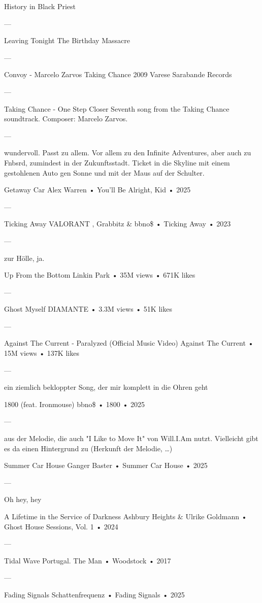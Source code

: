 History in Black
Priest

—

Leaving Tonight
The Birthday Massacre

—

Convoy - Marcelo Zarvos
Taking Chance
2009 Varese Sarabande Records

—

Taking Chance - One Step Closer
Seventh song from the Taking Chance soundtrack. Composer: Marcelo Zarvos.

—

wundervoll. Passt zu allem.
Vor allem zu den Infinite Adventures, aber auch zu Fnbsrd, zumindest in der Zukunftsstadt.
Ticket in die Skyline mit einem gestohlenen Auto gen Sonne und mit der Maus auf der Schulter.

Getaway Car
Alex Warren
 •
You'll Be Alright, Kid
 •
2025

—

Ticking Away
VALORANT
,
Grabbitz
 &
bbno\$
 •
Ticking Away
 •
2023

—

zur Hölle, ja.

Up From the Bottom
Linkin Park
 •
35M views
 •
671K likes


—

Ghost Myself
DIAMANTE
 •
3.3M views
 •
51K likes

—

Against The Current - Paralyzed (Official Music Video)
Against The Current
 •
15M views
 •
137K likes

—

ein ziemlich bekloppter Song, der mir komplett in die Ohren geht

1800 (feat. Ironmouse)
bbno\$
 •
1800
 •
2025

—

aus der Melodie, die auch "I Like to Move It" von Will.I.Am nutzt. Vielleicht gibt es da einen Hintergrund zu (Herkunft der Melodie, …)

Summer Car House
Ganger Baster
 •
Summer Car House
 •
2025

—

Oh hey,
hey

A Lifetime in the Service of Darkness
Ashbury Heights & Ulrike Goldmann
 •
Ghost House Sessions, Vol. 1
 •
2024

—

Tidal Wave
Portugal. The Man
 •
Woodstock
 • 2017

—

Fading Signals
Schattenfrequenz
 •
Fading Signals
 • 2025

